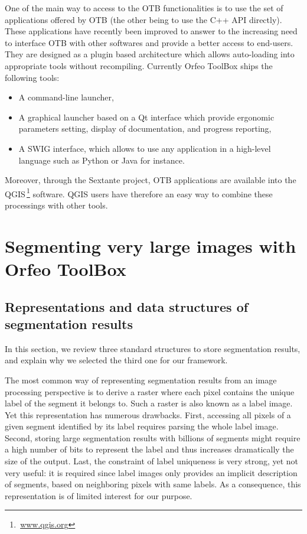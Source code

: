 \documentclass{josis}
\newcommand{\furl}[1]{$\,$\footnote{$\,$\url{#1}}}
\begin{document}
One of the main way to access to the OTB functionalities is to use the set of
applications offered by OTB (the other being to use the C++ API directly). These
applications have recently been improved to answer to the increasing need to
interface OTB with other softwares and provide a better access to end-users. They
are designed as a plugin based architecture which allows auto-loading into
appropriate tools without recompiling. Currently Orfeo ToolBox ships the
following tools:
\begin{itemize}
\item A command-line launcher,
\item A graphical launcher based on a Qt interface which provide
  ergonomic parameters setting, display of documentation, and progress
  reporting,
\item A SWIG interface, which allows to use any application in a
  high-level language such as Python or Java for instance.
\end{itemize}
Moreover, through the Sextante project, OTB applications are available
into the QGIS\furl{www.qgis.org} software. QGIS users have therefore
an easy way to combine these processings with other tools.

\section{Segmenting very large images with Orfeo ToolBox}\label{sec:seg}


\subsection{Representations and data structures of segmentation results}

In this section, we review three standard structures to store
segmentation results, and explain why we selected the third one for
our framework.

The most common way of representing segmentation results from an image
processing perspective is to derive a raster where each pixel contains
the unique label of the segment it belongs to. Such a raster is also
known as a label image. Yet this representation has numerous
drawbacks. First, accessing all pixels of a given segment identified
by its label requires parsing the whole label image. Second, storing
large segmentation results with billions of segments might require a
high number of bits to represent the label and thus increases
dramatically the size of the output. Last, the constraint of label
uniqueness is very strong, yet not very useful: it is required since
label images only provides an implicit description of segments, based
on neighboring pixels with same labels. As a consequence, this
representation is of limited interest for our purpose.
\end{document}

